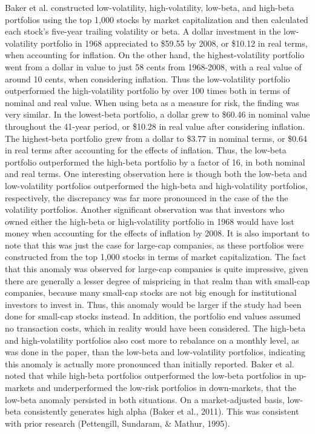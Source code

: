 \documentclass[12pt,twoside]{reedthesis}
\theoremstyle{definition}
\theoremstyle{definition}
\theoremstyle{definition}
\theoremstyle{remark}
\begin{document}
Baker et al. constructed low-volatility, high-volatility, low-beta, and
high-beta portfolios using the top 1,000 stocks by market capitalization
and then calculated each stock's five-year trailing volatility or beta.
A dollar investment in the low-volatility portfolio in 1968 appreciated
to \$59.55 by 2008, or \$10.12 in real terms, when accounting for
inflation. On the other hand, the highest-volatility portfolio went from
a dollar in value to just 58 cents from 1968-2008, with a real value of
around 10 cents, when considering inflation. Thus the low-volatility
portfolio outperformed the high-volatility portfolio by over 100 times
both in terms of nominal and real value. When using beta as a measure
for risk, the finding was very similar. In the lowest-beta portfolio, a
dollar grew to \$60.46 in nominal value throughout the 41-year period,
or \$10.28 in real value after considering inflation. The highest-beta
portfolio grew from a dollar to \$3.77 in nominal terms, or \$0.64 in
real terms after accounting for the effects of inflation. Thus, the
low-beta portfolio outperformed the high-beta portfolio by a factor of
16, in both nominal and real terms. One interesting observation here is
though both the low-beta and low-volatility portfolios outperformed the
high-beta and high-volatility portfolios, respectively, the discrepancy
was far more pronounced in the case of the the volatility portfolios.
Another significant observation was that investors who owned either the
high-beta or high-volatility portfolio in 1968 would have lost money
when accounting for the effects of inflation by 2008. It is also
important to note that this was just the case for large-cap companies,
as these portfolios were constructed from the top 1,000 stocks in terms
of market capitalization. The fact that this anomaly was observed for
large-cap companies is quite impressive, given there are generally a
lesser degree of mispricing in that realm than with small-cap companies,
because many small-cap stocks are not big enough for institutional
investors to invest in. Thus, this anomaly would be larger if the study
had been done for small-cap stocks instead. In addition, the portfolio
end values assumed no transaction costs, which in reality would have
been considered. The high-beta and high-volatility portfolios also cost
more to rebalance on a monthly level, as was done in the paper, than the
low-beta and low-volatility portfolios, indicating this anomaly is
actually more pronounced than initially reported. Baker et al. noted
that while high-beta portfolios outperformed the low-beta portfolios in
up-markets and underperformed the low-risk portfolios in down-markets,
that the low-beta anomaly persisted in both situations. On a
market-adjusted basis, low-beta consistently generates high alpha (Baker
et al., 2011). This was consistent with prior research (Pettengill,
Sundaram, \& Mathur, 1995).
\end{document}
